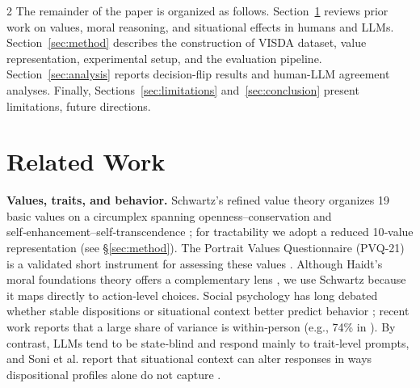 \documentclass[11pt]{article}
\begin{document}
\begin{multicols}{2}
    The remainder of the paper is organized as follows. Section~\ref{sec:related} reviews prior work on values, moral reasoning, and situational effects in humans and LLMs. Section~\ref{sec:method} describes the construction of VISDA dataset, value representation, experimental setup, and the evaluation pipeline. Section~\ref{sec:analysis} reports decision-flip results and human-LLM agreement analyses. 
    Finally, Sections~\ref{sec:limitations} and~\ref{sec:conclusion} present limitations, future directions.
\section{Related Work}
\label{sec:related}

\textbf{Values, traits, and behavior.}
Schwartz's refined value theory organizes 19 basic values on a circumplex spanning openness–conservation and self‑enhancement–self‑transcendence \citep{schwartz2012refined}; for tractability we adopt a reduced 10‑value representation (see \S\ref{sec:method}). The Portrait Values Questionnaire (PVQ‑21) is a validated short instrument for assessing these values \citep{schwartz2003proposal}. Although Haidt's moral foundations theory offers a complementary lens \citep{haidt2012righteous}, we use Schwartz because it maps directly to action‑level choices. Social psychology has long debated whether stable dispositions or situational context better predict behavior \citep{mischel1968personality, ross1991person}; recent work reports that a large share of variance is within‑person (e.g., 74\% in \citealp{harry2026beyond}). By contrast, LLMs tend to be state‑blind and respond mainly to trait‑level prompts, and Soni et al.
report that situational context can alter responses in ways dispositional profiles alone do not capture \citep{soni2025we}.


\end{multicols}
\end{document}
